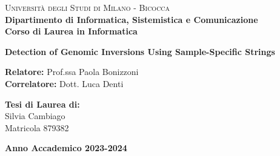 \begin{titlepage}
        
        \noindent
        \begin{minipage}[t]{0.19\textwidth}
        \end{minipage}
    \hspace{2mm}
    \begin{minipage}[t]{0.81\textwidth}
    {	
            {\textsc{Università degli Studi di Milano - Bicocca}} \\
            \textbf{Dipartimento di Informatica, Sistemistica e Comunicazione} \\
            \textbf{Corso di Laurea in Informatica} \\
            \par
    }
    \end{minipage}
    
\vspace{40mm}
    
\begin{center}
        {\Huge{
                \textbf{Detection of Genomic Inversions Using Sample-Specific Strings}
                \par
        }}
    \end{center}
    
    \vspace{50mm}

    \noindent
    {\large \textbf{Relatore:} Prof.ssa Paola Bonizzoni} \\

    \noindent
    {\large \textbf{Correlatore:} Dott. Luca Denti}
    
    \vspace{15mm}

    \begin{flushright}
        {\large \textbf{Tesi di Laurea di:}} \\
        \large{Silvia Cambiago} \\
        \large{Matricola 879382} 
    \end{flushright}
    
    \vspace{20mm}
    \begin{center}
        {\large{\bf Anno Accademico 2023-2024}}
    \end{center}
   
\end{titlepage}
\restoregeometry

